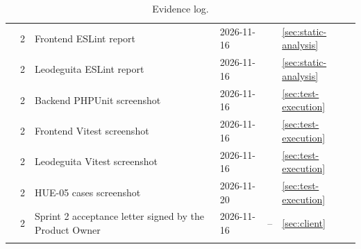 \begin{longtable}{@{}L{1.9cm}L{1.2cm}L{5cm}L{2.2cm}L{2cm}L{1.4cm}@{}}
   & 2 & Frontend ESLint report & 2026-11-16 &  &\ref{sec:static-analysis} \\
   & 2 & Leodeguita ESLint report & 2026-11-16 &  &\ref{sec:static-analysis} \\
   & 2 & Backend PHPUnit screenshot & 2026-11-16 &  &\ref{sec:test-execution} \\
   & 2 & Frontend Vitest screenshot & 2026-11-16 &  &\ref{sec:test-execution} \\
   & 2 & Leodeguita Vitest screenshot & 2026-11-16 &  &\ref{sec:test-execution} \\
   & 2 & HUE-05 cases screenshot & 2026-11-20 &  &\ref{sec:test-execution} \\
   & 2 & Sprint 2 acceptance letter signed by the Product Owner & 2026-11-16 & -- &\ref{sec:client} \\
  \bottomrule
  \caption{Evidence log.}
  \label{tab:evidence-log}
\end{longtable}
